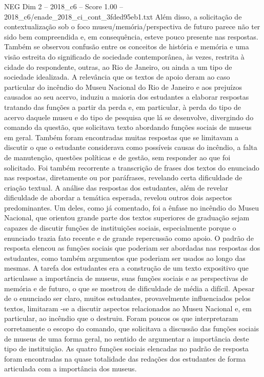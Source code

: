 \begin{textsample}{NEG Dim 2 – 2018\_c6 – Score 1.00 – 2018\_c6/enade\_2018\_ci\_cont\_3fded95eb1.txt}
Além disso, a solicitação de contextualização sob o foco museu/memória/perspectiva de futuro parece não ter sido bem compreendida e, em consequência, esteve pouco presente nas respostas.
Também se observou confusão entre os conceitos de história e memória e uma visão estreita do significado de sociedade contemporânea, às vezes, restrita à cidade do respondente, outras, ao Rio de Janeiro, ou ainda a um tipo de sociedade idealizada.
A relevância que os textos de apoio deram ao caso particular do incêndio do Museu Nacional do Rio de Janeiro e aos prejuízos causados ao seu acervo, induziu a maioria dos estudantes a elaborar respostas tratando das funções a partir da perda e, em particular, à perda do tipo de acervo daquele museu e do tipo de pesquisa que lá se desenvolve, divergindo do comando da questão, que solicitava texto abordando funções sociais de museus em geral.
Também foram encontradas muitas respostas que se limitavam a discutir o que o estudante considerava como possíveis causas do incêndio, a falta de manutenção, questões políticas e de gestão, sem responder ao que foi solicitado.
Foi também recorrente a transcrição de frases dos textos do enunciado nas respostas, diretamente ou por paráfrases, revelando certa dificuldade de criação textual.
A análise das respostas dos estudantes, além de revelar dificuldade de abordar a temática esperada, revelou outros dois aspectos predominantes.
Um deles, como já comentado, foi a ênfase no incêndio do Museu Nacional, que orientou grande parte dos textos superiores de graduação sejam capazes de discutir funções de instituições sociais, especialmente porque o enunciado trazia fato recente e de grande repercussão como apoio.
O padrão de resposta elencou as funções sociais que poderiam ser abordadas nas respostas dos estudantes, como também argumentos que poderiam ser usados ao longo das mesmas.
A tarefa dos estudantes era a construção de um texto expositivo que articulasse a importância de museus, suas funções sociais e as perspectivas de memória e de futuro, o que se mostrou de dificuldade de média a difícil.
Apesar de o enunciado ser claro, muitos estudantes, provavelmente influenciados pelos textos, limitaram -se a discutir aspectos relacionados ao Museu Nacional e, em particular, ao incêndio que o destruiu.
Foram poucos os que interpretaram corretamente o escopo do comando, que solicitava a discussão das funções sociais de museus de uma forma geral, no sentido de argumentar a importância deste tipo de instituição.
As quatro funções sociais elencadas no padrão de resposta foram encontradas na quase totalidade das redações dos estudantes de forma articulada com a importância dos museus.

\end{textsample}
